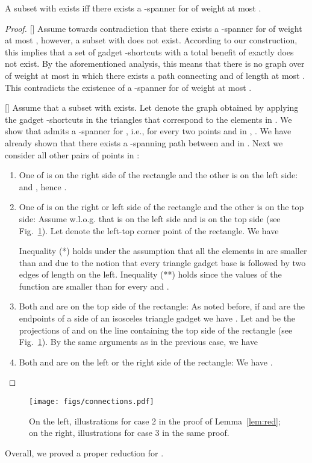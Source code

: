 \documentclass[a4paper]{llncs}
\begin{document}
\begin{lemma}\label{lem:red}
A subset  with  exists 
iff there exists a -spanner for  of weight at most .
\end{lemma} 

\begin{proof}

[] Assume towards contradiction that 
there exists a -spanner for  of weight at most , however, 
a subset  with  does not exist. 
According to our construction, this implies that a set of gadget -shortcuts 
with a total benefit of exactly  does not exist. 
By the aforementioned analysis, this means that there is no graph over 
of weight at most  in which there exists a path connecting  and  of length at most .
This contradicts the existence of a -spanner for  of weight at most .

[] Assume that a subset  with  exists.
Let  denote the graph obtained by applying the gadget -shortcuts
in the triangles that correspond to the elements in .
We show that  admits a -spanner for , i.e., 
for every two points  and  in , .
We have already shown that there exists a -spanning path between  and  in .
Next we consider all other pairs of points  in :
\begin{enumerate}

\item One of  is on the right side of the rectangle and the other is on the left side:
 and , hence .

\item One of  is on the right or left side of the rectangle and the other is on the top side:
Assume w.l.o.g. that  is on the left side and  is on the top side (see Fig.~\ref{fig:connections}). 
Let  denote the left-top corner point of the rectangle.
We have

Inequality (*) holds under the assumption that all the elements in  are
smaller than  and due to the notion that
every triangle gadget base is followed by two edges of length  on the left.
Inequality (**) holds since the values of the function 
are smaller than  for every  and .

\item Both  and  are on the top side of the rectangle:
As noted before, if  and  are the endpoints of a side of 
an isosceles triangle gadget we have .
Let  and  be the projections of  and  on the line 
containing the top side of the rectangle (see Fig.~\ref{fig:connections}).
By the same arguments as in the previous case, 
we have 


\item Both  and  are on the left or the right side of the rectangle:
We have .
\end{enumerate}

\end{proof}
\begin{figure}[htb]
    \centering
        \texttt{[image: figs/connections.pdf]}
    \caption{On the left, illustrations for case 2 in the proof of Lemma~\ref{lem:red};
    on the right, illustrations for case 3 in the same proof. }
    \label{fig:connections}
\end{figure}
Overall, we proved a proper reduction for .
\end{document}
